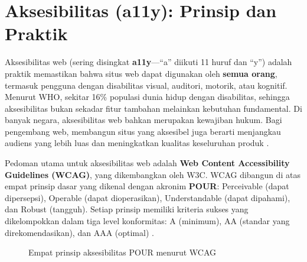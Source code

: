 \section[Aksesibilitas: Prinsip dan Praktik]{Aksesibilitas (a11y): Prinsip dan Praktik}

Aksesibilitas web (sering disingkat \textbf{a11y}---``a'' diikuti 11 huruf dan ``y'') adalah praktik memastikan bahwa situs web dapat digunakan oleh \textbf{semua orang}, termasuk pengguna dengan disabilitas visual, auditori, motorik, atau kognitif. Menurut WHO, sekitar 16\% populasi dunia hidup dengan disabilitas, sehingga aksesibilitas bukan sekadar fitur tambahan melainkan kebutuhan fundamental. Di banyak negara, aksesibilitas web bahkan merupakan kewajiban hukum. Bagi pengembang web, membangun situs yang aksesibel juga berarti menjangkau audiens yang lebih luas dan meningkatkan kualitas keseluruhan produk \cite{mdnAccessibility}.

Pedoman utama untuk aksesibilitas web adalah \textbf{Web Content Accessibility Guidelines (WCAG)}, yang dikembangkan oleh W3C. WCAG dibangun di atas empat prinsip dasar yang dikenal dengan akronim \textbf{POUR}: Perceivable (dapat dipersepsi), Operable (dapat dioperasikan), Understandable (dapat dipahami), dan Robust (tangguh). Setiap prinsip memiliki kriteria sukses yang dikelompokkan dalam tiga level konformitas: A (minimum), AA (standar yang direkomendasikan), dan AAA (optimal) \cite{wcagW3c}.

\begin{figure}[htbp]
\centering
{}
\caption{Empat prinsip aksesibilitas POUR menurut WCAG}
\end{figure}


